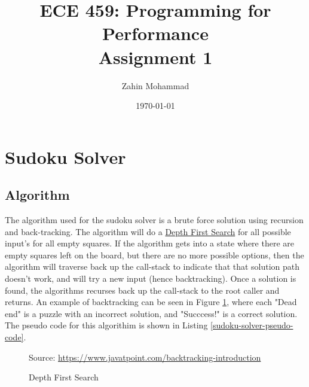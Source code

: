 \documentclass[12pt]{article}
\title{ECE 459: Programming for Performance\\Assignment 1}
\author{Zahin Mohammad}
\date{\today}
\begin{document}
\maketitle

\section{Sudoku Solver}
\subsection{Algorithm}
\label{algorithm}
The algorithm used for the sudoku solver is a brute force solution using recursion and back-tracking.
The algorithm will do a \href{https://en.wikipedia.org/wiki/Depth-first_search}{Depth First Search}
for all possible input's for all empty squares.
If the algorithm gets into a state where there are empty squares left on the board, but there are no more possible options,
then the algorithm will traverse back up the call-stack to indicate that that solution path doesn't work, and will try a new input (hence backtracking).
Once a solution is found, the algorithms recurses back up the call-stack to the root caller and returns.
An example of backtracking can be seen in Figure \ref*{fig:back-tracking},
where each "Dead end" is a puzzle with an incorrect solution, and "Succcess!" is a correct solution.
The pseudo code for this algorithim is shown in Listing \ref*{sudoku-solver-pseudo-code}.

\begin{figure}[!h]
    \centering
    {Source: \url{https://www.javatpoint.com/backtracking-introduction}}
    \caption{Depth First Search}
    \label{fig:back-tracking}
\end{figure}
\end{document}
